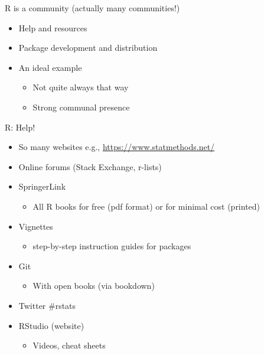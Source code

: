 \documentclass[
  ignorenonframetext,
]{beamer}
\providecommand{\tightlist}{%
  \setlength{\itemsep}{0pt}\setlength{\parskip}{0pt}}
\begin{document}
\begin{frame}{R is a community (actually many communities!)}
\protect\hypertarget{r-is-a-community-actually-many-communities}{}

\begin{itemize}
\tightlist
\item
  Help and resources
\item
  Package development and distribution
\item
  An ideal example

  \begin{itemize}
  \tightlist
  \item
    Not quite always that way
  \item
    Strong communal presence
  \end{itemize}
\end{itemize}

\end{frame}

\begin{frame}{R: Help!}
\protect\hypertarget{r-help}{}

\begin{itemize}
\tightlist
\item
  So many websites e.g., \url{https://www.statmethods.net/}
\item
  Online forums (Stack Exchange, r-lists)
\item
  SpringerLink

  \begin{itemize}
  \tightlist
  \item
    All R books for free (pdf format) or for minimal cost (printed)
  \end{itemize}
\item
  Vignettes

  \begin{itemize}
  \tightlist
  \item
    step-by-step instruction guides for packages
  \end{itemize}
\item
  Git

  \begin{itemize}
  \tightlist
  \item
    With open books (via bookdown)
  \end{itemize}
\item
  Twitter \#rstats
\item
  RStudio (website)

  \begin{itemize}
  \tightlist
  \item
    Videos, cheat sheets
  \end{itemize}
\end{itemize}

\end{frame}
\end{document}
